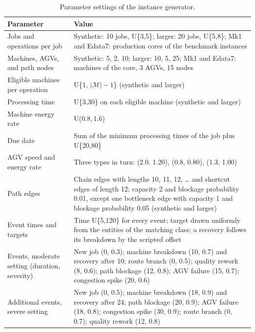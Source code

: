 \begin{table}
\centering
\begin{threeparttable}
\caption{Parameter settings of the instance generator.}
\label{tab:v9-generator}
\footnotesize
\setlength{\tabcolsep}{4pt}
\begin{tabularx}{\textwidth}{@{}l>{\raggedright\arraybackslash}X@{}}
\toprule
Parameter & Value \\
\midrule
Jobs and operations per job & Synthetic: 10 jobs, U\{3,5\}; larger: 20 jobs, U\{5,8\}; Mk1 and Edata7: production cores of the benchmark instances \\
Machines, AGVs, and path nodes & Synthetic: 5, 2, 10; larger: 10, 5, 25; Mk1 and Edata7: machines of the core, 3 AGVs, 15 nodes \\
Eligible machines per operation & U\{1, $|\mathcal{M}|-1$\} (synthetic and larger) \\
Processing time & U\{3,30\} on each eligible machine (synthetic and larger) \\
Machine energy rate & U(0.8,\,1.6) \\
Due date & Sum of the minimum processing times of the job plus U\{20,80\} \\
AGV speed and energy rate & Three types in turn: (2.0, 1.20), (0.8, 0.80), (1.3, 1.00) \\
Path edges & Chain edges with lengths 10, 11, 12, \dots{} and shortcut edges of length 12; capacity 2 and blockage probability 0.01, except one bottleneck edge with capacity 1 and blockage probability 0.05 (synthetic and larger) \\
Event times and targets & Time U\{5,120\} for every event; target drawn uniformly from the entities of the matching class; a recovery follows its breakdown by the scripted offset \\
Events, moderate setting (duration, severity) & New job (0, 0.3); machine breakdown (10, 0.7) and recovery after 10; route branch (0, 0.5); quality rework (8, 0.6); path blockage (12, 0.8); AGV failure (15, 0.7); congestion spike (20, 0.6) \\
Additional events, severe setting & New job (0, 0.5); machine breakdown (18, 0.9) and recovery after 24; path blockage (20, 0.9); AGV failure (18, 0.8); congestion spike (30, 0.9); route branch (0, 0.7); quality rework (12, 0.8) \\
\bottomrule
\end{tabularx}
\end{threeparttable}
\end{table}
